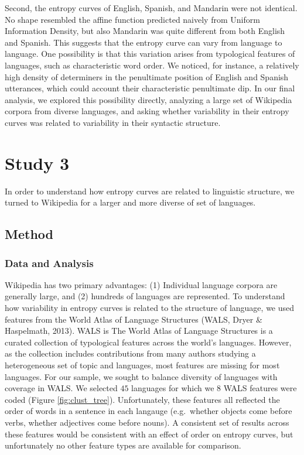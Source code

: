 \documentclass[10pt, letterpaper]{article}
\begin{document}
Second, the entropy curves of English, Spanish, and Mandarin were not
identical. No shape resembled the affine function predicted naively from
Uniform Information Density, but also Mandarin was quite different from
both English and Spanish. This suggests that the entropy curve can vary
from language to language. One possibility is that this variation arises
from typological features of languages, such as characteristic word
order. We noticed, for instance, a relatively high density of
determiners in the penultimate position of English and Spanish
utterances, which could account their characteristic penultimate dip. In
our final analysis, we explored this possibility directly, analyzing a
large set of Wikipedia corpora from diverse languages, and asking
whether variability in their entropy curves was related to variability
in their syntactic structure.

\hypertarget{study-3}{%
\section{Study 3}\label{study-3}}

In order to understand how entropy curves are related to linguistic
structure, we turned to Wikipedia for a larger and more diverse of set
of languages.

\hypertarget{method}{%
\subsection{Method}\label{method}}

\hypertarget{data-and-analysis-2}{%
\subsubsection{Data and Analysis}\label{data-and-analysis-2}}

Wikipedia has two primary advantages: (1) Individual language corpora
are generally large, and (2) hundreds of languages are represented. To
understand how variability in entropy curves is related to the structure
of language, we used features from the World Atlas of Language
Structures (WALS, Dryer \& Haspelmath, 2013). WALS is The World Atlas of
Language Structures is a curated collection of typological features
across the world's languages. However, as the collection includes
contributions from many authors studying a heterogeneous set of topic
and languages, most features are missing for most languages. For our
sample, we sought to balance diversity of languages with coverage in
WALS. We selected \(45\) languages for which we \(8\) WALS features were
coded (Figure \ref{fig:clust_tree}). Unfortunately, these features all
reflected the order of words in a sentence in each langauge
(e.g.~whether objects come before verbs, whether adjectives come before
nouns). A consistent set of results across these features would be
consistent with an effect of order on entropy curves, but unfortunately
no other feature types are available for comparison.
\end{document}
